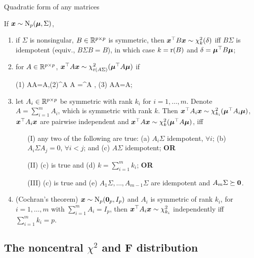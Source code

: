 \documentclass[10pt,a4paper]{book}
\begin{document}
\begin{thmbox}{Quadratic form of any matrices}
	\begin{theorem}\label{thm:quad_MVN_general}If ${\boldsymbol x}\sim\mathrm{N}_p({\boldsymbol\mu},\Sigma)$,
		\begin{enumerate}
			\item if $\Sigma$ is nonsingular, $B\in\mathbb R^{p\times p}$ is symmetric, then ${\boldsymbol x}^\top B{\boldsymbol x}\sim\chi_{k}^2(\delta)$ iff $B\Sigma$ is idempotent (equiv., $B\Sigma B=B$), in which case $k=\mathrm{r}(B)$ and $\delta={\boldsymbol\mu}^\top B{\boldsymbol\mu}$;
			
			\item for $A\in\mathbb R^{p\times p}$, ${\boldsymbol x}^\top A {\boldsymbol x}\sim\chi_{\mathrm{r}(A\Sigma)}^2({\boldsymbol\mu}^\top A{\boldsymbol\mu})$ if 
			\begin{sequation*}
				(1) \Sigma A\Sigma A\Sigma=\Sigma A\Sigma,\quad (2)\bam^\TT A \Sigma A \bam=\bam^\TT A \bam, \quad (3) \Sigma A\Sigma A\bam=\Sigma A\bam;
			\end{sequation*} 

			\item let $A_i\in\mathbb R^{p\times p}$ be symmetric with rank $k_i$ for $i=1,\ldots,m$.   
			Denote $A=\sum_{i=1}^m A_i$, which is symmetric with rank $k$.
			Then ${\boldsymbol x}^\top A_i {\boldsymbol x}\sim\chi_{k_i}^2 ({\boldsymbol\mu}^\top A_i{\boldsymbol\mu})$, 
			${\boldsymbol x}^\top A_i{\boldsymbol x}$ are pairwise independent and ${\boldsymbol x}^\top A {\boldsymbol x}\sim\chi_{k}^2 ({\boldsymbol\mu}^\top A {\boldsymbol\mu})$, iff 
			\begin{enumerate}
				\item[(I)] any two of the following are true: (a) $A_i\Sigma$ idempotent, $\forall i$; (b) $A_i\Sigma A_j=0$, $\forall i<j$; and (c) $A\Sigma$ idempotent; \textbf{OR}
				\item[(II)] (c) is true and (d) $k=\sum_{i=1}^{m}k_i$; \textbf{OR}
				\item[(III)] (c) is true and (e) $A_1\Sigma,\ldots,A_{m-1}\Sigma$ are idempotent and $A_m \Sigma\succeq {\boldsymbol 0}$.    
			\end{enumerate}    
			
			\item (Cochran's theorem) ${\boldsymbol x}\sim \mathrm{N}_p({\boldsymbol 0}_p,I_p)$ and $A_i$ is symmetric of rank $k_i$, for $i=1,\ldots,m$ with $\sum_{i=1}^{m}A_i=I_p$,
			then ${\boldsymbol x}^\top A_i {\boldsymbol x} \sim \chi_{k_i}^2$ independently iff $\sum_{i=1}^{m}k_i=p$.       
		\end{enumerate}      
	\end{theorem}
\end{thmbox}

\subsection{The noncentral $\chi^2$ and F distribution}\label{sec:noncen_chi2_F}
\end{document}
